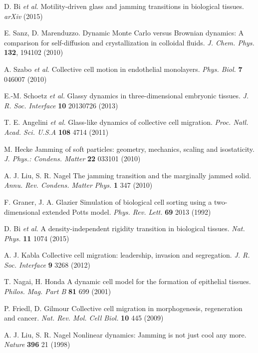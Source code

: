 \documentclass[a4paper,12pt]{article}
\newcommand{\etal}{\emph{et al. }}
\begin{document}
%   
%
\begin{thebibliography}{99}
		D. Bi \etal
		Motility-driven glass and jamming transitions in biological tissues.
		\emph{arXiv}
		(2015)
	
		E. Sanz, D. Marenduzzo.
		Dynamic Monte Carlo versus Brownian dynamics: A comparison for self-diffusion and crystallization in colloidal fluids.
		\emph{J. Chem. Phys.}
		\textbf{132}, 194102 (2010)
	
		A. Szabo \etal
		Collective cell motion in endothelial monolayers.
		\emph{Phys. Biol.}
		\textbf{7} 046007 (2010)
		
		E.-M. Schoetz \etal
		Glassy dynamics in three-dimensional embryonic tissues.
		\emph{J. R. Soc. Interface}
		\textbf{10} 20130726 (2013)
	
		T. E. Angelini \etal
		Glass-like dynamics of collective cell migration.
		\emph{Proc. Natl. Acad. Sci. U.S.A}
		\textbf{108} 4714 (2011)
	
		M. Hecke
		Jamming of soft particles: geometry, mechanics, scaling and isostaticity.
		\emph{J. Phys.: Condens. Matter}
		\textbf{22} 033101 (2010)
	
		A. J. Liu, S. R. Nagel
		The jamming transition and the marginally jammed solid.
		\emph{Annu. Rev. Condens. Matter Phys.}
		\textbf{1} 347 (2010)
		
		F. Graner, J. A. Glazier
		Simulation of biological cell sorting using a two-dimensional extended Potts model.
		\emph{Phys. Rev. Lett.}
		\textbf{69} 2013 (1992)
	
		D. Bi \etal
		A density-independent rigidity transition in biological tissues.
		\emph{Nat. Phys.}
		\textbf{11} 1074 (2015)
		
		A. J. Kabla
		Collective cell migration: leadership, invasion and segregation.
		\emph{J. R. Soc. Interface}
		\textbf{9} 3268 (2012)
	
		T. Nagai, H. Honda
		A dynamic cell model for the formation of epithelial tissues.
		\emph{Philos. Mag. Part B}
		\textbf{81} 699 (2001)
	
		P. Friedl, D. Gilmour
		Collective cell migration in morphogenesis, regeneration and cancer.
		\emph{Nat. Rev. Mol. Cell Biol.}
		\textbf{10} 445 (2009)
	
		A. J. Liu, S. R. Nagel
		Nonlinear dynamics: Jamming is not just cool any more.
		\emph{Nature}
		\textbf{396} 21 (1998)

\end{thebibliography}
\end{document}
